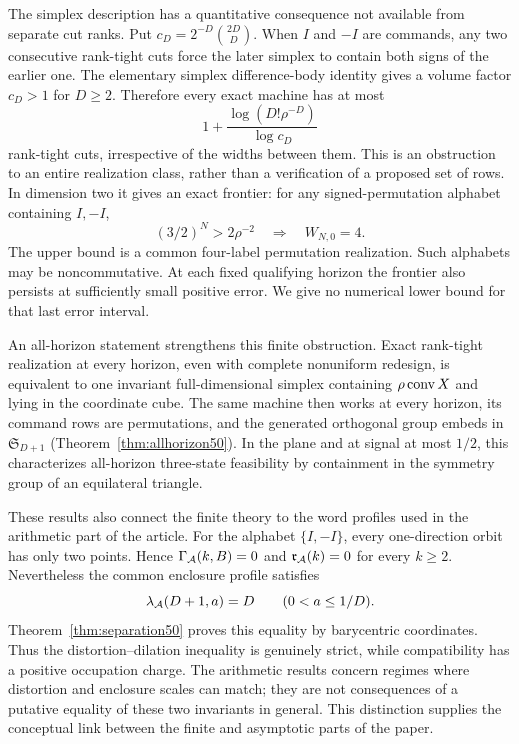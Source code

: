 The simplex description has a quantitative consequence not available
from separate cut ranks. Put $c_D=2^{-D}\binom{2D}{D}$. When $I$ and
$-I$ are commands, any two consecutive rank-tight cuts force the later
simplex to contain both signs of the earlier one. The elementary
simplex difference-body identity gives a volume factor $c_D>1$ for
$D\ge2$. Therefore every exact machine has at most
\begin{equation}\label{eq:intro-budget50}
 1+\frac{\log(D!\rho^{-D})}{\log c_D}
\end{equation}
rank-tight cuts, irrespective of the widths between them. This is an
obstruction to an entire realization class, rather than a verification
of a proposed set of rows. In dimension two it gives an exact frontier:
for any signed-permutation alphabet containing $I,-I$,
\[
 (3/2)^N>2\rho^{-2}\quad\Longrightarrow\quad W_{N,0}=4.
\]
The upper bound is a common four-label permutation realization. Such
alphabets may be noncommutative. At each fixed qualifying horizon the
frontier also persists at sufficiently small positive error. We give
no numerical lower bound for that last error interval.

An all-horizon statement strengthens this finite obstruction. Exact
rank-tight realization at every horizon, even with complete nonuniform
redesign, is equivalent to one invariant full-dimensional simplex
containing $\rho\operatorname{conv} X$ and lying in the coordinate cube. The same
machine then works at every horizon, its command rows are permutations,
and the generated orthogonal group embeds in $\mathfrak S_{D+1}$
(Theorem~\ref{thm:allhorizon50}). In the plane and at signal at most
$1/2$, this characterizes all-horizon three-state feasibility by
containment in the symmetry group of an equilateral triangle.

These results also connect the finite theory to the word profiles
used in the arithmetic part of the article. For the alphabet
$\{I,-I\}$, every one-direction orbit has only two points. Hence
$\Gamma_{\mathcal A}(k,B)=0$ and $\mathfrak r_{\mathcal A}(k)=0$ for every
$k\ge2$. Nevertheless the common enclosure profile satisfies
\[
 \lambda_{\mathcal A}(D+1,a)=D\qquad(0<a\le1/D).
\]
Theorem~\ref{thm:separation50} proves this equality by barycentric
coordinates. Thus the distortion--dilation inequality is genuinely
strict, while compatibility has a positive occupation charge. The
arithmetic results concern regimes where distortion and enclosure
scales can match; they are not consequences of a putative equality
of these two invariants in general. This distinction supplies the
conceptual link between the finite and asymptotic parts of the paper.

